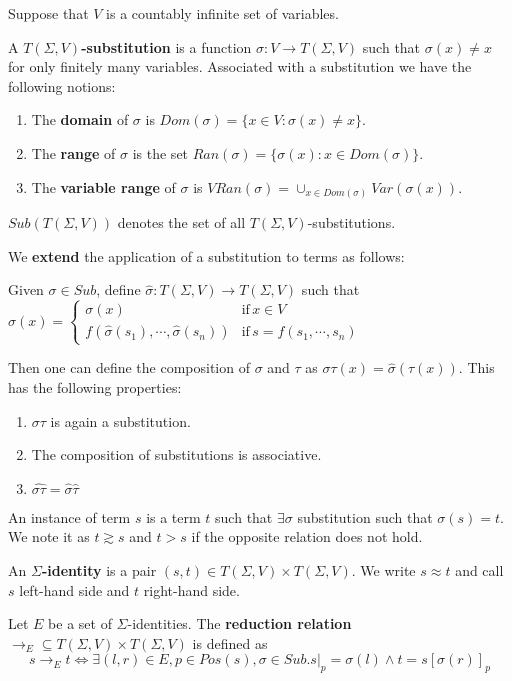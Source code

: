 \begin{definition}[Substitutions]
Suppose that $V$ is a countably infinite set of variables. 

A \textbf{$T(\Sigma,V)$-substitution} is a function $\sigma:V \rightarrow T(\Sigma,V)$ such that $\sigma(x) \neq x$ for only finitely many variables. Associated with a substitution we have the following notions:

\begin{enumerate}
\item The \textbf{domain} of $\sigma$ is $Dom(\sigma) = \{x \in V: \sigma(x) \neq x\}$.
\item The \textbf{range} of $\sigma$ is the set $Ran(\sigma) = \{\sigma(x):x \in Dom(\sigma)\}$.
\item The \textbf{variable range} of $\sigma$ is $VRan(\sigma) = \cup_{x \in Dom(\sigma)} Var(\sigma(x))$.
\end{enumerate}

$Sub(T(\Sigma,V))$ denotes the set of all $T(\Sigma,V)$-substitutions.

We \textbf{extend} the application of a substitution to terms as follows:

Given $\sigma \in Sub$, define $\hat\sigma: T(\Sigma,V) \to T(\Sigma,V)$ such that $
\hat\sigma(x)=
\begin{cases}
 \sigma(x)&\text{if}\, x \in V\\
 f(\hat\sigma(s_1),\cdots,\hat\sigma(s_n))&\text{if}\, s = f(s_1,\cdots,s_n)
\end{cases}$

Then one can define the composition of $\sigma$ and $\tau$ as $\sigma\tau(x) = \hat\sigma(\tau(x))$. This has the following properties:

\begin{enumerate}
\item $\sigma\tau$ is again a substitution.
\item The composition of substitutions is associative.
\item $\hat{\sigma\tau} = \hat\sigma \hat\tau$
\end{enumerate}

An instance of term $s$ is a term $t$ such that  $\exists \sigma$ substitution such that $\sigma(s) = t$.  We note it as $t \gtrsim s$ and $t > s$ if the opposite relation does not hold. 
\end{definition}

\begin{definition}
An \textbf{$\Sigma$-identity} is a pair $(s,t) \in T(\Sigma,V) \times T(\Sigma,V)$. We write $s \approx t$ and call $s$ left-hand side and $t$ right-hand side.  

Let $E$ be a set of $\Sigma$-identities. The \textbf{reduction relation} $\to_E \subseteq T(\Sigma,V) \times T(\Sigma,V)$ is defined as $$s \to_E t \iff \exists (l,r) \in E, p \in Pos(s), \sigma \in Sub. s|_p = \sigma(l) \land t = s[\sigma(r)]_p$$
\end{definition}

